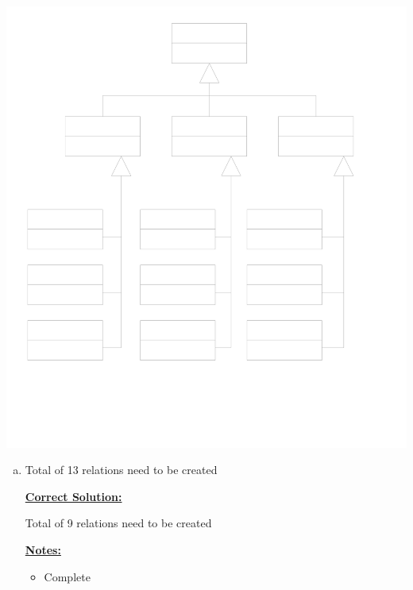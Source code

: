 \documentclass[12pt]{article}
\begin{document}
\begin{enumerate}[1.]
    \begin{center}
    \includegraphics[width=\linewidth]{images/worksheet_15_solution_39.png}
    \end{center}

    \begin{enumerate}[a)]
        \item

        Total of 13 relations need to be created

        \bigskip

        \begin{mdframed}
            \underline{\textbf{Correct Solution:}}

            \bigskip

            Total of \color{red}9\color{black} relations need to be created
        \end{mdframed}

        \bigskip

        \underline{\textbf{Notes:}}

        \bigskip

        \begin{itemize}
            \item Complete


\end{itemize}
\end{enumerate}
\end{enumerate}
\end{document}
